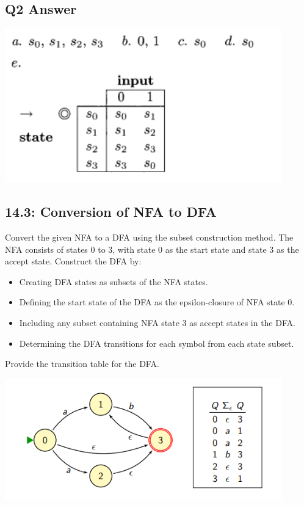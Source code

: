 \documentclass{article}
\begin{document}
\subsection*{Q2 Answer}

\begin{center}
    \includegraphics[width=12cm]{2.png}
\end{center}
\newpage
\subsection*{14.3: Conversion of NFA to DFA}
Convert the given NFA to a DFA using the subset construction method. The NFA consists of states 0 to 3, with state 0 as the start state and state 3 as the accept state. Construct the DFA by:

\begin{itemize}
  \item Creating DFA states as subsets of the NFA states.
  \item Defining the start state of the DFA as the epsilon-closure of NFA state 0.
  \item Including any subset containing NFA state 3 as accept states in the DFA.
  \item Determining the DFA transitions for each symbol from each state subset.
\end{itemize}

Provide the transition table for the DFA.
\begin{center}
    \includegraphics[width=12cm]{3.png}
\end{center}
\end{document}
